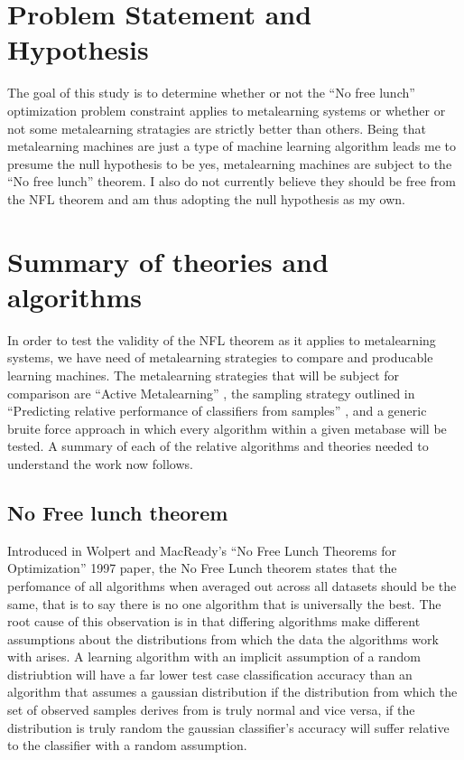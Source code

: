 \documentclass[a4paper,11pt]{article}
\begin{document}
\section{Problem Statement and Hypothesis}
  The goal of this study is to determine whether or not the ``No free lunch'' optimization problem
  constraint applies to metalearning systems or whether or not some metalearning stratagies are strictly
  better than others. Being that metalearning machines are just a type of machine learning algorithm
  leads me to presume the null hypothesis to be yes, metalearning machines are subject to the
  ``No free lunch'' theorem. I also do not currently believe they should be free from the NFL theorem
  and am thus adopting the null hypothesis as my own.

  \section{Summary of theories and algorithms}

  In order to test the validity of the NFL theorem as it applies to metalearning systems,
  we have need of metalearning strategies to compare and producable learning machines.
  The metalearning strategies that will be subject for comparison are ``Active Metalearning'' \cite{Bhatt},
  the sampling strategy outlined in ``Predicting relative performance of classifiers from samples'' \cite{Leite},
  and a generic bruite force approach in which every algorithm within a given metabase will be tested. A
  summary of each of the relative algorithms and theories needed to understand the work now follows.

\subsection{No Free lunch theorem}
Introduced in Wolpert and MacReady's ``No Free Lunch Theorems for Optimization'' 1997 paper,
the No Free Lunch theorem states that the perfomance of all algorithms when averaged out across all
  datasets should be the same, that is to say there is no one algorithm that is universally the best.
  The root cause of this observation is in that differing algorithms make different assumptions about the
  distributions from which the data the algorithms work with arises. A learning algorithm with an implicit
  assumption of a random distriubtion will have a far lower test case classification accuracy than an
  algorithm that assumes a gaussian distribution if the distribution from which the set of observed
  samples derives from is truly normal and vice versa, if the distribution is truly random the gaussian
  classifier's accuracy will suffer relative to the classifier with a random assumption.
\end{document}
